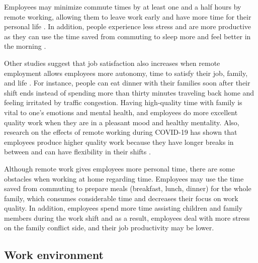 \documentclass[12pt]{article}
\begin{document}
Employees may minimize commute times by at least one and a half hours by remote working, allowing them to leave work early and have more time for their personal life \cite{george2022}. In addition, people experience less stress and are more productive as they can use the time saved from commuting to sleep more and feel better in the morning \cite{george2022}.

Other studies suggest that job satisfaction also increases when remote employment allows employees more autonomy, time to satisfy their job, family, and life \cite{natasha2016}. For instance, people can eat dinner with their families soon after their shift ends instead of spending more than thirty minutes traveling back home and feeling irritated by traffic congestion. Having high-quality time with family is vital to one’s emotions and mental health, and employees do more excellent quality work when they are in a pleasant mood and healthy mentality. Also, research on the effects of remote working during COVID-19 has shown that employees produce higher quality work because they have longer breaks in between and can have flexibility in their shifts \cite{wangb2021}.

Although remote work gives employees more personal time, there are some obstacles when working at home regarding time. Employees may use the time saved from commuting to prepare meals (breakfast, lunch, dinner) for the whole family, which consumes considerable time and decreases their focus on work quality. In addition, employees spend more time assisting children and family members during the work shift and as a result, employees deal with more stress on the family conflict side, and their job productivity may be lower. 

\subsection*{Work environment}
\end{document}
